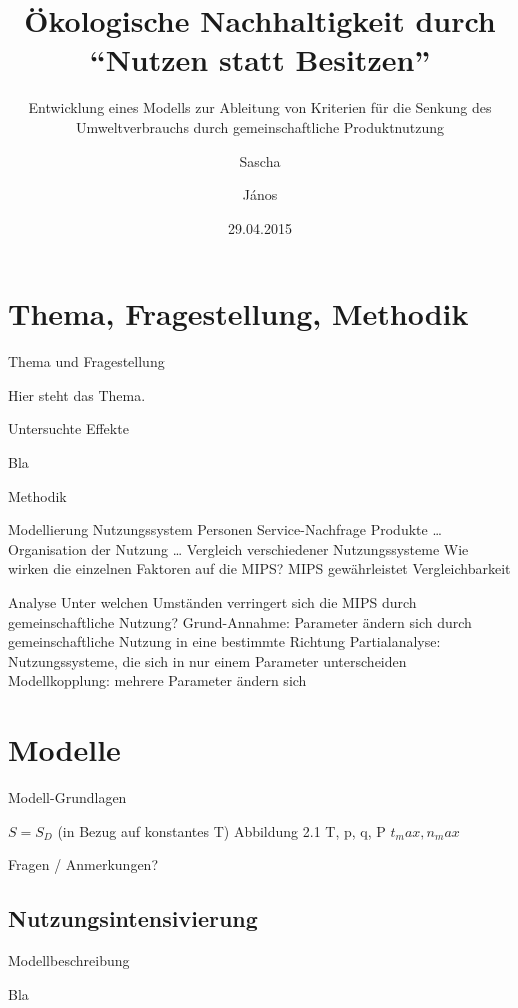 \documentclass[beamer]{beamer}
\title{Ökologische Nachhaltigkeit durch \\ \enquote{Nutzen statt Besitzen}}
\subtitle{Entwicklung eines Modells zur Ableitung von Kriterien für die Senkung des Umweltverbrauchs durch gemeinschaftliche Produktnutzung}
\author{Sascha \and János}
\date{29.04.2015}
\begin{document}
\frame{\titlepage}


\section{Thema, Fragestellung, Methodik}

	\begin{frame}{Thema und Fragestellung}
	  \begin{center}
	  	Hier steht das Thema.
	  \end{center}
	\end{frame}
	
	\begin{frame}{Untersuchte Effekte}
		\begin{center}
			Bla
		\end{center}
	\end{frame}
	
	\begin{frame}{Methodik}
		\begin{center}
			Modellierung
				Nutzungssystem
					Personen
					Service-Nachfrage
					Produkte
						…
					Organisation der Nutzung
						…
				Vergleich verschiedener Nutzungssysteme
					Wie wirken die einzelnen Faktoren auf die MIPS?
					MIPS gewährleistet Vergleichbarkeit
			
			Analyse
				Unter welchen Umständen verringert sich die MIPS durch gemeinschaftliche Nutzung?
				Grund-Annahme: Parameter ändern sich durch gemeinschaftliche Nutzung in eine bestimmte Richtung
				Partialanalyse: Nutzungssysteme, die sich in nur einem Parameter unterscheiden
				Modellkopplung: mehrere Parameter ändern sich	
		\end{center}
	\end{frame}

\section{Modelle}
	\begin{frame}{Modell-Grundlagen}
		\begin{center}
			$S = S_D$ (in Bezug auf konstantes T)
			Abbildung 2.1
			T, p, q, P
			$t_max, n_max$
			
			Fragen / Anmerkungen?
		\end{center}
	\end{frame}

\subsection{Nutzungsintensivierung}
	\frame{\subsectionpage}
	\begin{frame}{Modellbeschreibung}
		\begin{center}
			Bla
		\end{center}
	\end{frame}
	
\end{document}
